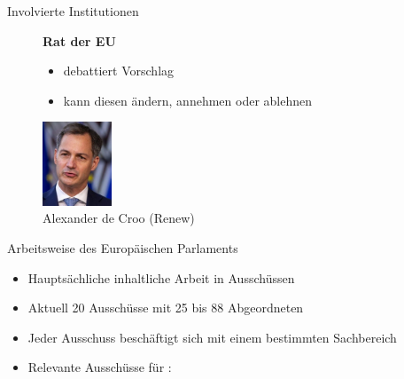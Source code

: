 \documentclass{beamer}
\begin{document}
\begin{frame}{Involvierte Institutionen}
\begin{figure}[!htb]
\begin{minipage}[t]{0.32\textwidth}
\begin{center}
        \vspace{-0.75cm}
        {\footnotesize \textbf{Rat der EU}}
        \newline
        \begin{itemize}
            \item {\scriptsize debattiert Vorschlag}
            \item {\scriptsize kann diesen ändern, annehmen oder ablehnen}
        \end{itemize}
        \vspace{0.1cm}
        \includegraphics[height=2.5cm]{Bilder/decroo.png}
        \caption*{\tiny Alexander de Croo (Renew)}
        \end{center}
    \end{minipage}
    \end{figure}
\end{frame}


\begin{frame}{Arbeitsweise des Europäischen Parlaments}
    \vspace{-1cm}
    \begin{itemize}
        \item Hauptsächliche inhaltliche Arbeit in Ausschüssen
        \item Aktuell 20 Ausschüsse mit 25 bis 88 Abgeordneten
        \item Jeder Ausschuss beschäftigt sich mit einem bestimmten Sachbereich
        \item Relevante Ausschüsse für \topic:
        \ausschuesse
    \end{itemize}
\end{frame}

\begin{frame}{\slideOneTitle}
    \slideOne
\end{frame}

\begin{frame}{\slideTwoTitle}
    \slideTwo
\end{frame}

\begin{frame}{\slideThreeTitle}
    \slideThree
\end{frame}

\begin{frame}{\slideFourTitle}
    \slideFour
\end{frame}
\end{document}
